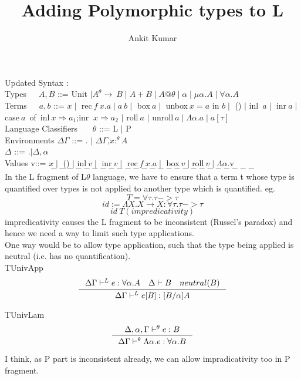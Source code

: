 \message{ !name(PolyLTheta.tex)}\documentclass[12pt]{article}
\title{%
  Adding Polymorphic types to L\theta}
\author{Ankit Kumar}
\begin{document}

Updated Syntax :\\

Types\ \ \ $A,B$ ::= Unit $\mid A^{\theta} \rightarrow\ B \mid A+B
\mid A@\theta \mid \alpha \mid \mu \alpha.A \mid \forall \alpha.A$ \\

Terms\ \ \ $a,b$ ::= $x \mid$  rec$\ f\ x.a \mid a\ b \mid$ box$\ a \mid$
unbox$\ x=a$ in $b \mid$ () $\mid$ inl\ $a \mid$ inr$\ a \mid$ case$\ a$\ of\
{inl$\ x \Rightarrow a_1$;inr $\ x \Rightarrow a_2$} $\mid$ roll$\ a$
$\mid$ unroll$\ a \mid \Lambda \alpha.a \mid a[\tau]$  \\

Language Classifiers \ \ \  $\theta$ ::= L $\mid$ P \\

Environments $\Delta\Gamma$ ::= . $\mid $ $\Delta \Gamma$,$x:^{\theta}
A$\\

 \hspace{25 mm}           $ \Delta$   ::=  .$\mid \Delta,\alpha$\\

Values v::= $x \mid $ () $\mid $ inl$\ v \mid $ inr$\ v \mid $ rec$\
f\ x.a \mid $ box$\ v \mid $roll$\ v \mid \Lambda \alpha$.v\\
$$
-------------------------
$$
In the L fragment of L$\theta$ language, we have to ensure that a term
t whose type is quantified over types is not applied to another type
which is quantified. eg. 
$$
T = \forall \tau.\tau -> \tau 
$$
$$
id := \Lambda X.X \rightarrow X : \forall \tau.\tau -> \tau 
$$
$$
 id\ T (impredicativity)
$$
impredicativity causes the L fragment to be inconsistent (Russel's
paradox) and hence we need a way to limit such type applications.\\

One way would be to allow type application, such that the type being
applied is neutral (i.e. has no quantification).\\

TUnivApp
$$
\inference{\Delta\Gamma \vdash^{L} e:\forall \alpha.A \quad \Delta \vdash
B \quad neutral(B)}{\Delta\Gamma \vdash^{L} e[B]:[B/\alpha]A}  
$$

TUnivLam
$$
\inference{\Delta,\alpha,\Gamma \vdash^{\theta} e:B}{\Delta\Gamma
  \vdash^{\theta} \Lambda \alpha.e:\forall \alpha.B}
$$

I think, as P part is inconsistent already, we can allow
impradicativity too in P fragment.
\end{document}
